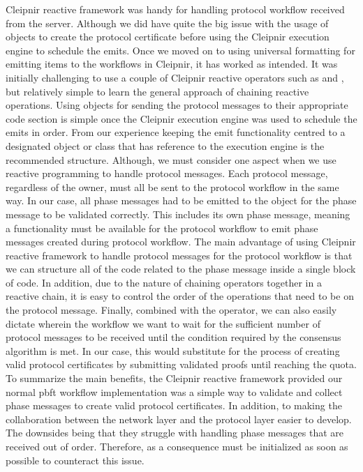 Cleipnir reactive framework was handy for handling protocol workflow received from the server. Although we did have quite the big issue with the usage of  objects to create the protocol certificate before using the Cleipnir execution engine to schedule the emits. Once we moved on to using universal formatting for emitting items to the workflows in Cleipnir, it has worked as intended. It was initially challenging to use a couple of Cleipnir reactive operators such as  and , but relatively simple to learn the general approach of chaining reactive operations. Using  objects for sending the protocol messages to their appropriate code section is simple once the Cleipnir execution engine was used to schedule the emits in order. From our experience keeping the emit functionality centred to a designated object or class that has reference to the execution engine is the recommended structure. Although, we must consider one aspect when we use reactive programming to handle protocol messages. Each protocol message, regardless of the owner, must all be sent to the protocol workflow in the same way. In our case, all phase messages had to be emitted to the  object for the phase message to be validated correctly. This includes its own phase message, meaning a functionality must be available for the protocol workflow to emit phase messages created during protocol workflow. The main advantage of using Cleipnir reactive framework to handle protocol messages for the protocol workflow is that we can structure all of the code related to the phase message inside a single block of code. In addition, due to the nature of chaining operators together in a reactive chain, it is easy to control the order of the operations that need to be on the protocol message. Finally, combined with the  operator, we can also easily dictate wherein the workflow we want to wait for the sufficient number of protocol messages to be received until the condition required by the consensus algorithm is met. In our case, this would substitute for the process of creating valid protocol certificates by submitting validated proofs until reaching the quota.
To summarize the main benefits, the Cleipnir reactive framework provided our normal \ac{pbft} workflow implementation was a simple way to validate and collect phase messages to create valid protocol certificates.  In addition, to making the collaboration between the network layer and the protocol layer easier to develop. The downsides being that they struggle with handling phase messages that are received out of order. Therefore, as a consequence must be initialized as soon as possible to counteract this issue. 

